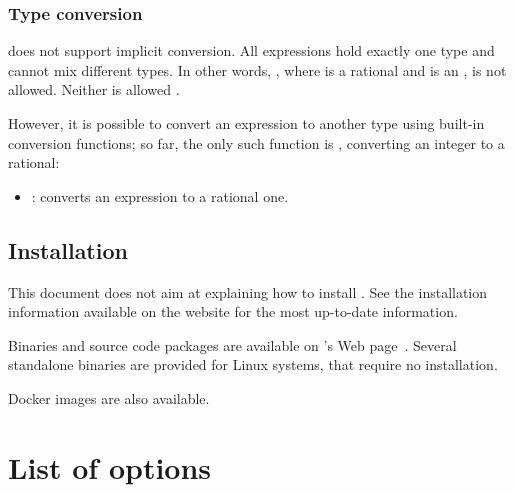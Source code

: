 \subsection{Type conversion}

\imitator{} does not support implicit conversion.
All expressions hold exactly one type and cannot mix different types.
In other words, , where  is a rational and  is an , is not allowed.
Neither is allowed .

However, it is possible to convert an expression to another type using built-in conversion functions;
so far, the only such function is , converting an integer to a rational:

\begin{itemize}
	\item {}: converts an  expression to a rational one.
\end{itemize}



\section{Installation}

This document does not aim at explaining how to install \imitator{}.
See the installation information available on the website for the most up-to-date information.

Binaries and source code packages are available on \imitator{}'s Web page~\cite{imitator}.
Several standalone binaries are provided for Linux systems, that require no installation.

Docker images are also available.






\chapter{List of options}\label{chapter:options}

